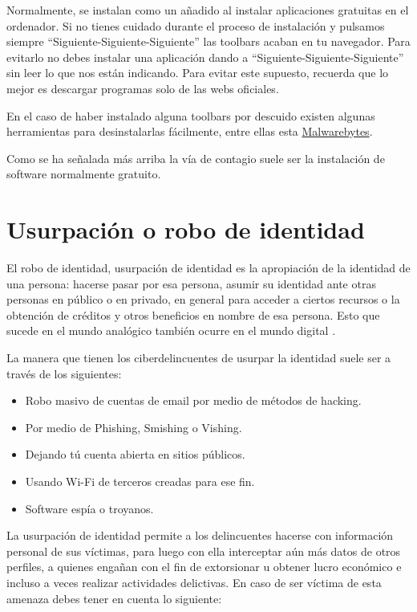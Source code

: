 \documentclass[
  a4paper,
  openany]{book}
\begin{document}
Normalmente, se instalan como un añadido al instalar aplicaciones gratuitas en el ordenador. Si no tienes cuidado durante el proceso de instalación y pulsamos siempre ``Siguiente-Siguiente-Siguiente'' las toolbars acaban en tu navegador. Para evitarlo no debes instalar una aplicación dando a ``Siguiente-Siguiente-Siguiente'' sin leer lo que nos están indicando. Para evitar este supuesto, recuerda que lo mejor es descargar programas solo de las webs oficiales.

En el caso de haber instalado alguna toolbars por descuido existen algunas herramientas para desinstalarlas fácilmente, entre ellas esta \href{https://es.malwarebytes.com/adwcleaner/}{Malwarebytes}.

Como se ha señalada más arriba la vía de contagio suele ser la instalación de software normalmente gratuito.

\hypertarget{usurpaciuxf3n-o-robo-de-identidad}{%
\section{Usurpación o robo de identidad}\label{usurpaciuxf3n-o-robo-de-identidad}}

El robo de identidad, usurpación de identidad es la apropiación de la identidad de una persona: hacerse pasar por esa persona, asumir su identidad ante otras personas en público o en privado, en general para acceder a ciertos recursos o la obtención de créditos y otros beneficios en nombre de esa persona. Esto que sucede en el mundo analógico también ocurre en el mundo digital \citep{WIKI-usurpacion}.

La manera que tienen los ciberdelincuentes de usurpar la identidad suele ser a través de los siguientes:

\begin{itemize}
\item
  Robo masivo de cuentas de email por medio de métodos de hacking.
\item
  Por medio de Phishing, Smishing o Vishing.
\item
  Dejando tú cuenta abierta en sitios públicos.
\item
  Usando Wi-Fi de terceros creadas para ese fin.
\item
  Software espía o troyanos.
\end{itemize}

La usurpación de identidad permite a los delincuentes hacerse con información personal de sus víctimas, para luego con ella interceptar aún más datos de otros perfiles, a quienes engañan con el fin de extorsionar u obtener lucro económico e incluso a veces realizar actividades delictivas.
En caso de ser víctima de esta amenaza debes tener en cuenta lo siguiente:
\end{document}
